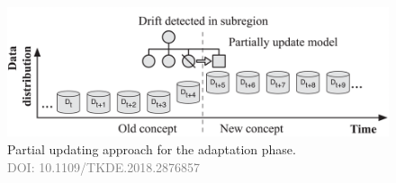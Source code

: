 \begin{enumerate}[label=\Alph*.]
 \begin{figure}[!ht]
    \centering
    \includegraphics[width=.9\textwidth]{2_Background/figures/partial_update.png}
    \caption{Partial updating approach for the adaptation phase. \\ \textcolor{gray}{\fontsize{10}{0}\selectfont DOI: 10.1109/TKDE.2018.2876857}}
    \label{fig:concept-drift-partial-update}
\end{figure}
\end{enumerate}
